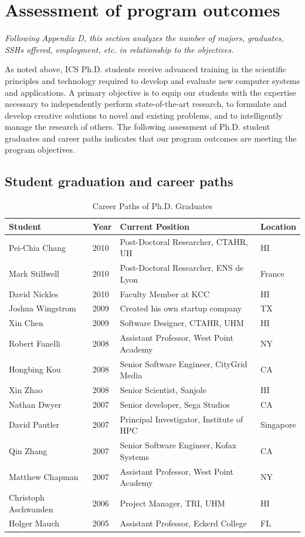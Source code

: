 \documentclass[12pt]{article}
\begin{document}
\section{Assessment of program outcomes}

{\em Following Appendix D, this section analyzes the number of majors,
  graduates, SSHs offered, employment, etc. in relationship to the
  objectives.}

As noted above, ICS Ph.D. students receive advanced training in the
scientific principles and technology required to develop and evaluate new
computer systems and applications. A primary objective is to equip our
students with the expertise necessary to independently perform
state-of-the-art research, to formulate and develop creative solutions to
novel and existing problems, and to intelligently manage the research of
others.  The following assessment of Ph.D. student graduates and career
paths indicates that our program outcomes are meeting the program
objectives. 

\subsection{Student graduation and career paths}

\begin{table}[Htb]
\caption{Career Paths of Ph.D. Graduates}
\label{tab.phd}
\begin{tabular}{|l|l|l|l|}
\hline
Student & Year & Current Position & Location \\
\hline
Pei-Chia Chang & 2010 & Post-Doctoral Researcher, CTAHR, UH & HI \\
Mark Stillwell & 2010 & Post-Doctoral Researcher, ENS de Lyon & France \\
David Nickles & 2010 & Faculty Member at KCC & HI \\
Joshua Wingstrom & 2009 & Created his own startup company & TX\\
Xin Chen & 2009 & Software Designer, CTAHR, UHM & HI\\
Robert Fanelli & 2008 & Assistant Professor, West Point Academy & NY\\
Hongbing Kou & 2008 & Senior Software Engineer, CityGrid Media &  CA\\
Xin Zhao & 2008 & Senior Scientist, Sanjole & HI\\
Nathan Dwyer & 2007 & Senior developer, Sega Studios & CA\\
David Pautler & 2007 & Principal Investigator, Institute of HPC & Singapore\\
Qin Zhang & 2007 & Senior Software Engineer, Kofax Systems & CA\\
Matthew Chapman & 2007 & Assistant Professor, West Point Academy & NY\\
Christoph Aschwanden & 2006 & Project Manager, TRI, UHM & HI\\
Holger Mauch & 2005 & Assistant Professor, Eckerd College & FL\\
\hline
\end{tabular}
\end{table}
\end{document}
